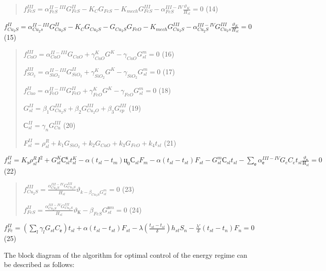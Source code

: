 \begin{quote}
\(f_{FeS}^{III} = \alpha_{FeS}^{II - III}G_{FeS}^{II} - K_{C}G_{FeS} - K_{mech}G_{FeS}^{III} - \alpha_{FeS}^{III - IV}\frac{\vartheta_{K}}{H_{sl}} = 0\)
(14)
\end{quote}

\(f_{Cu_{2}S}^{II} = \alpha_{Cu_{2}s}^{II - III}G_{Cu_{2}S}^{II} - K_{C}G_{Cu_{2}S} - G_{Cu_{2}S}G_{FeO} - K_{mech}G_{Cu_{2}S}^{III} - \alpha_{Cu_{2}S}^{III - IV}G_{Cu_{2}s}^{III}\frac{\vartheta_{K}}{H_{sl}} = 0\)
(15)

\begin{quote}
\(f_{CaO}^{III} = \alpha_{CaO}^{II - III}G_{CaO} + \gamma_{CaO}^{K}G^{K} - \gamma_{CaO}G_{sl}^{m} = 0\)
(16)

\(f_{SO_{2}}^{III} = \alpha_{SiO_{2}}^{II - III}G_{SiO_{2}}^{II} + \gamma_{SiO_{2}}^{K}G^{K} - \gamma_{SiO_{2}}G_{sl}^{m} = 0\)
(17)

\(f_{Cao}^{II} = \alpha_{FeO}^{II - III}G_{FeO}^{II} + \gamma_{FeO}^{K}G^{K} - \gamma_{FeO}G_{sl}^{m} = 0\)
(18)

\(G_{sl}^{II} = \beta_{1}G_{Cu_{2}S}^{III} + \beta_{2}G_{Cu_{2}O}^{III} + \beta_{3}G_{cp}^{III}\)
(19)

\(С_{sl}^{II} = \gamma_{n}G_{Cu}^{III}\) (20)

\(F_{sl}^{II} = \rho_{sl}^{R} + k_{1}G_{SiO_{2}} + k_{2}G_{CaO} + k_{3}G_{FeO} + k_{4}t_{sl}\)
(21)
\end{quote}

\(f_{sl}^{II} = K_{э}\rho_{sl}^{R}I^{2} + G_{sl}^{K}С_{sl}^{к}t_{sl}^{K} - \alpha(t_{sl} - t_{m})ц_{0}С_{sl}F_{m} - \alpha(t_{sl} - t_{st})F_{st} - G_{sl}^{m}С_{sl}t_{sl} - \sum_{е}^{}\alpha_{е}^{III - IV}G_{e}C_{e}t_{sl}\frac{\vartheta_{к}}{Н_{sl}} = 0\)
(22)

\begin{quote}
\(f_{Cu_{2}S}^{III} = \frac{\alpha_{Cu_{2}S}^{III - IV}G_{Cu_{2}S}^{III}}{H_{sl}}\vartheta_{k - \beta_{Cu_{2}S}G_{st}^{m}} = 0\)
(23)

\(f_{FeS}^{II} = \frac{\alpha_{Cu_{2}S}^{III - IV}G_{Cu_{2}S}^{III}}{H_{sl}}\vartheta_{К} - \beta_{FeS}G_{st}^{вm} = 0\)
(24)
\end{quote}

\(f_{Fe}^{II} = (\sum_{l}^{}{\gamma_{l}G_{st}C_{е}})t_{sl} + \alpha(t_{sl} - t_{st})F_{st} - \lambda(\frac{t_{st} - t_{sl}}{\delta})h_{st}S_{n} - \frac{\lambda'}{\delta}(t_{st} - t_{n})F_{n} = 0\)
(25)

The block diagram of the algorithm for optimal control of the energy
regime can be described as follows:

